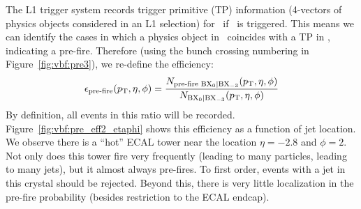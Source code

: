 The L1 trigger system records trigger primitive (TP) information (4-vectors of physics objects considered in an L1 selection) for ~if ~is triggered.
This means we can identify the cases in which a physics object in ~coincides with a TP in , indicating a pre-fire. 
Therefore (using the bunch crossing numbering in Figure~\ref{fig:vbf:pre3}), we re-define the efficiency:
\begin{equation}
    \epsilon_\text{pre-fire}(p_\mathrm{T},\eta,\phi) = \frac{N_\text{pre-fire \ensuremath{{\mathrm{BX}_{0}}}|\ensuremath{{\mathrm{BX}_{-3}}}}(p_\mathrm{T},\eta,\phi)}{N_\text{\ensuremath{{\mathrm{BX}_{0}}}|\ensuremath{{\mathrm{BX}_{-3}}}}(p_\mathrm{T},\eta,\phi)}
\end{equation}
By definition, all events in this ratio will be recorded. 
Figure~\ref{fig:vbf:pre_eff2_etaphi} shows this efficiency as a function of jet location. 
We observe there is a ``hot'' ECAL tower near the location $\eta=-2.8$ and $\phi=2$.
Not only does this tower fire very frequently (leading to many particles, leading to many jets), but it almost always pre-fires.
To first order, events with a jet in this crystal should be rejected.
Beyond this, there is very little localization in the pre-fire probability (besides restriction to the ECAL endcap). 

